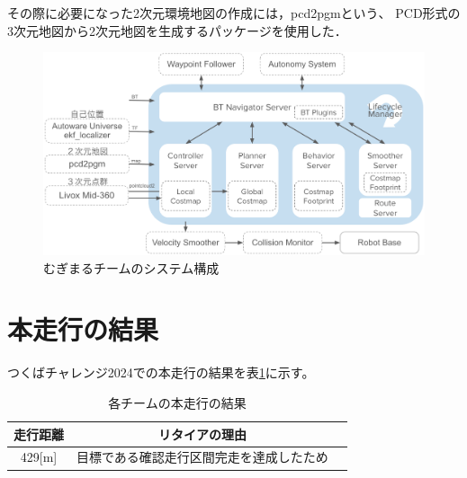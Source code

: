 \documentclass[twocolumn,9pt]{jsproceedings}
\begin{document}
その際に必要になった2次元環境地図の作成には，pcd2pgmという、
PCD形式の3次元地図から2次元地図を生成するパッケージを使用した．

\begin{figure}[h]
  \begin{center}
    \includegraphics[width=1.0\linewidth]{figs/mugimaru_system.pdf}
    \caption{むぎまるチームのシステム構成}
    \label{fig:mugimaru_system}
  \end{center}
\end{figure}



\section{本走行の結果}

つくばチャレンジ2024での本走行の結果を表\ref{MainRun}に示す。

\begin{table}[H]
  \caption{各チームの本走行の結果}
  \label{MainRun}
  \begin{tabular}{|c|c|p{4.0cm}|}
    \hline
    走行距離 & リタイアの理由                                                                                             \\
    \hline
    429[m]   & 目標である確認走行区間完走を達成したため                                                           \\
    \hline
  \end{tabular}
\end{table}
\end{document}
